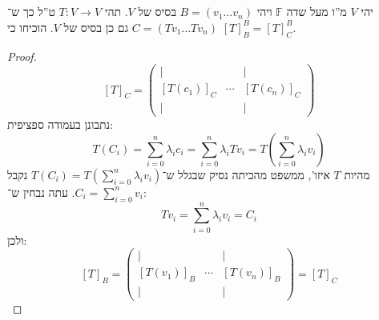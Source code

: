 \documentclass[]{article}
\newcommand\sumni     {\sum_{i = 0}^{n}}
\newcommand\F         {\mathbb{F}}
\newcommand\co        {\colon}
\newcommand\pms[1]    {\begin{pmatrix}
		#1
\end{pmatrix}}
\renewcommand\lg      {\lambda}
\newcommand\cl [1]    {\left ( #1 \right )}
\theoremstyle{definition}
\begin{document}
	 \section{}
	 יהי $V$ מ''ו מעל שדה $\F$ ויהי $B = (v_1 \dots v_n)$ בסיס של $V$. תהי $T \co V \to V$ ט''ל כך ש־$C = (Tv_1 \dots Tv_n)$ גם כן בסיס של $V$. הוכיחו כי $[T]^B_B = [T]^B_C$. 
	 
	 \begin{proof}
	 	\[ [T]_C = \pms{\vert & & \vert \\ [T(c_1)]_C & \cdots & [T(c_n)]_C \\ \vert & & \vert} \]
	 	נתבונן בעמודה ספציפית: 
	 	\[ T(C_i) = \sumni \lg_i c_i = \sumni \lg_i Tv_i = T\cl{\sumni \lg_i v_i} \]
	 	מהיות $T$ איזו', ממשפט מהכיתה נסיק שבגלל ש־$T(C_i) = T(\sumni \lg_i v_i)$ נקבל $C_i = \sumni v_i$. 
	 	עתה נבחין ש־: 
	 	\[ Tv_i = \sumni \lg_i v_i = C_i  \]
	 	ולכן: 
	 	\[ [T]_B = \pms{\vert && \vert \\ [T(v_1)]_B & \cdots & [T(v_n)]_B \\ \vert && \vert} = [T]_C \]
	 	
	 \end{proof}
	
	
\end{document}
